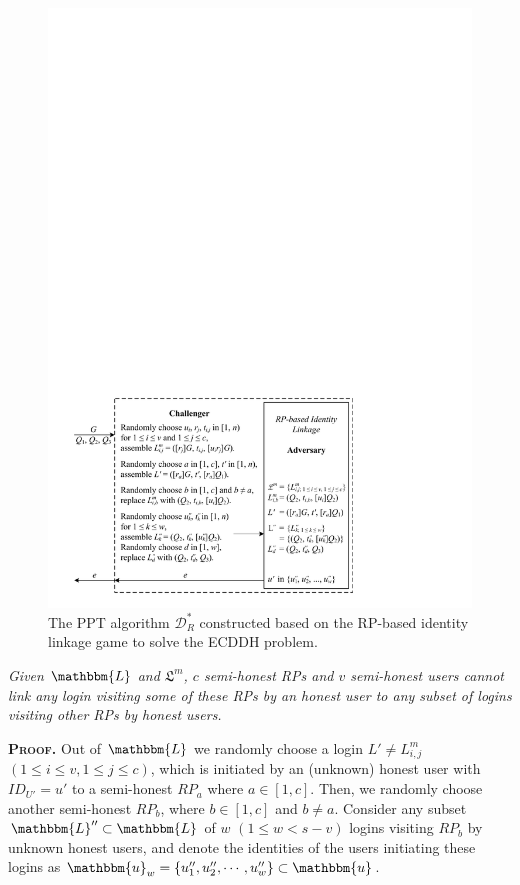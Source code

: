 \begin{figure}[tb]
  \centering
  \includegraphics[width=1.0\linewidth]{fig/rp-linkage-game.pdf}
  \caption{The PPT algorithm $\mathcal{D}^*_R$ constructed based on the RP-based identity linkage game to solve the ECDDH problem.}
  \label{fig:dalgorithm}
\end{figure}


\vspace{1.5mm}
\begin{thm}[RP Unlinkability]
\emph{Given $\mathbbm{L}$ and $\mathfrak{L}^m$, $c$ semi-honest RPs and $v$ semi-honest users cannot link any login visiting some of these RPs by an honest user to any subset of logins visiting other RPs by honest users.}
\label{thm-rp-unlinkability}
\end{thm}

\noindent\textbf{\textsc{Proof.}} Out of $\mathbbm{L}$
 we randomly choose a login $L' \neq L^m_{i,j}$ $(1 \le i \le v, 1 \le j \le c)$,
 which is initiated by an (unknown) honest user with $ID_{U'}=u'$ to a semi-honest $RP_{a}$ where $a \in [1,c]$.
Then, we randomly choose another semi-honest $RP_{b}$, where $b \in [1,c]$ and $b \neq a$.
Consider any subset $\mathbbm{L}'' \subset \mathbbm{L}$ of $w$ $(1 \leq w < s-v)$ logins visiting $RP_{b}$ by unknown honest users,
 and denote the identities of the users initiating these logins as $\mathbbm{u}_w=\{{u''_1}, {u''_2}, \cdots, {u''_w}\} \subset \mathbbm{u}$.

